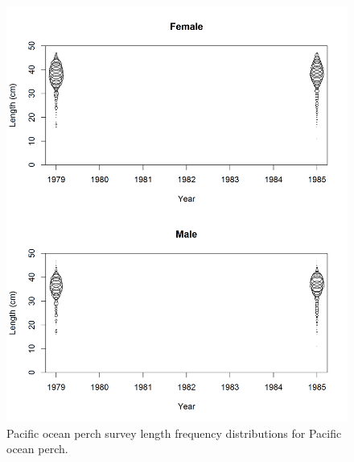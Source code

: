 \documentclass[12pt,]{article}
\begin{document}
\begin{figure}
\centering
\includegraphics{Figures/POP_lengths.png}
\caption{Pacific ocean perch survey length frequency distributions for
Pacific ocean perch. \label{fig:POP_Length}}
\end{figure}
\end{document}
